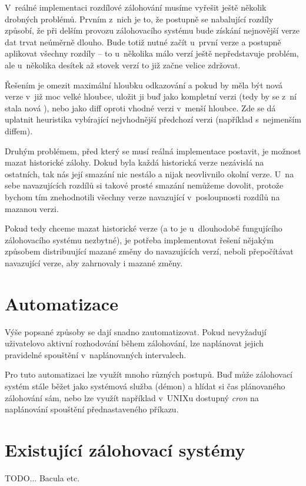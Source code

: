 V~reálné implementaci rozdílové zálohování musíme vyřešit ještě několik drobných
problémů. Prvním z~nich je to, že postupně se nabalující rozdíly způsobí, že
při delším provozu zálohovacího systému bude získání nejnovější verze dat trvat
neúměrně dlouho. Bude totiž nutné začít u~první verze a postupně aplikovat
všechny rozdíly -- to u~několika málo verzí ještě nepředstavuje problém, ale
u~několika desítek až stovek verzí to již začne velice zdržovat.

Řešením je omezit maximální hloubku odkazování a pokud by měla být nová verze
v~již moc velké hloubce, uložit ji buď jako kompletní verzi (tedy by se z~ní
stala nová ), nebo jako diff oproti vhodné verzi v~menší
hloubce. Zde se dá uplatnit heuristika vybírající nejvhodnější předchozí verzi
(například s~nejmenším diffem).

Druhým problémem, před který se musí reálná implementace postavit, je možnost
mazat historické zálohy. Dokud byla každá historická verze nezávislá na
ostatních, tak nás její smazání nic nestálo a nijak neovlivnilo okolní verze.
U~na sebe navazujících rozdílů si takové prosté smazání nemůžeme dovolit,
protože bychom tím znehodnotili všechny verze navazující v~posloupnosti rozdílů
na mazanou verzi.

Pokud tedy chceme mazat historické verze (a to je u~dlouhodobě fungujícího
zálohovacího systému nezbytné), je potřeba implementovat řešení nějakým
způsobem distribuující mazané změny do navazujících verzí, neboli přepočítávat
navazující verze, aby zahrnovaly i mazané změny.

\section{Automatizace}

Výše popsané způsoby se dají snadno zautomatizovat. Pokud nevyžadují uživatelovo
aktivní rozhodování během zálohování, lze naplánovat jejich pravidelné spouštění
v~naplánovaných intervalech.

Pro tuto automatizaci lze využít mnoho různých postupů. Buď může zálohovací
systém stále běžet jako systémová služba (démon) a hlídat si čas plánovaného
zálohování sám, nebo lze využít například v~\gls{UNIX}u dostupný {\it cron} na
naplánování spouštění přednastaveného příkazu.

\section{Existující zálohovací systémy}

TODO... Bacula etc.
